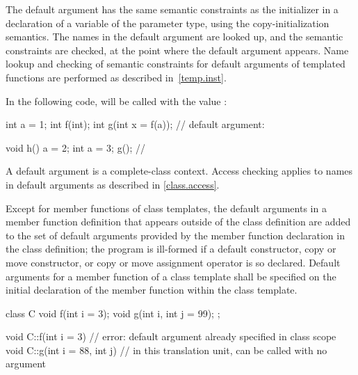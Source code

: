 \pnum
{}%
%
%
The default argument has the
same semantic constraints as the initializer in a
declaration of a variable of the parameter type, using the
copy-initialization semantics.
The names in the
default argument are looked up, and the semantic constraints are checked,
at the point where the default argument appears.
Name lookup and checking of semantic constraints for default
arguments of templated functions are performed as described in~\ref{temp.inst}.
\begin{example}
In the following code,
%
will be called with the value
:

\begin{codeblock}
int a = 1;
int f(int);
int g(int x = f(a));            // default argument: 

void h() {
  a = 2;
  {
  int a = 3;
  g();                          // 
  }
}
\end{codeblock}
\end{example}
\begin{note}
A default argument is a complete-class context.
Access checking applies to names in default arguments as
described in \ref{class.access}.
\end{note}

\pnum
Except for member functions of class templates, the
default arguments in a member function definition that appears
outside of the class definition
are added to the set of default arguments provided by the
member function declaration in the class definition;
the program is ill-formed if a default constructor,
copy or move constructor, or
copy or move assignment operator
is so declared.
Default arguments for a member function of a class template
shall be specified on the initial declaration of the member
function within the class template.
\begin{example}
\begin{codeblock}
class C {
  void f(int i = 3);
  void g(int i, int j = 99);
};

void C::f(int i = 3) {}         // error: default argument already specified in class scope
void C::g(int i = 88, int j) {} // in this translation unit,  can be called with no argument
\end{codeblock}
\end{example}

